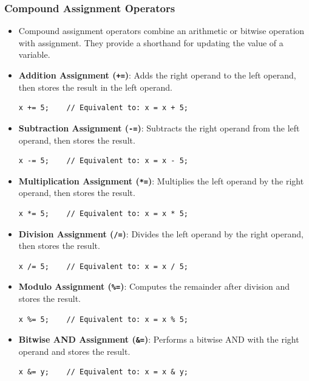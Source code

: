 \documentclass[10pt]{article}
\begin{document}
\newpage

\subsubsection{Compound Assignment Operators}

\begin{itemize}
	\item Compound assignment operators combine an arithmetic or bitwise operation with assignment. They provide a shorthand for updating the value of a variable.

	\item \textbf{Addition Assignment (\texttt{+=})}: Adds the right operand to the left operand, then stores the result in the left operand.
	\begin{verbatim}
x += 5;    // Equivalent to: x = x + 5;
	\end{verbatim}

	\item \textbf{Subtraction Assignment (\texttt{-=})}: Subtracts the right operand from the left operand, then stores the result.
	\begin{verbatim}
x -= 5;    // Equivalent to: x = x - 5;
	\end{verbatim}

	\item \textbf{Multiplication Assignment (\texttt{*=})}: Multiplies the left operand by the right operand, then stores the result.
	\begin{verbatim}
x *= 5;    // Equivalent to: x = x * 5;
	\end{verbatim}

	\item \textbf{Division Assignment (\texttt{/=})}: Divides the left operand by the right operand, then stores the result.
	\begin{verbatim}
x /= 5;    // Equivalent to: x = x / 5;
	\end{verbatim}

	\item \textbf{Modulo Assignment (\texttt{\%=})}: Computes the remainder after division and stores the result.
	\begin{verbatim}
x %= 5;    // Equivalent to: x = x % 5;
	\end{verbatim}

	\item \textbf{Bitwise AND Assignment (\texttt{\&=})}: Performs a bitwise AND with the right operand and stores the result.
	\begin{verbatim}
x &= y;    // Equivalent to: x = x & y;
	\end{verbatim}


\end{itemize}
\end{document}
